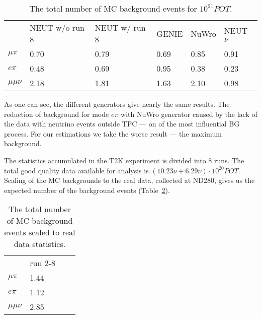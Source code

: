 \documentclass[../main.tex]{subfiles}
\begin{document}
\begin{table}[!ht]
\begin{center}
\begin{tabular}{llllll}
                            & NEUT w/o run 8      & NEUT w/ run 8         & GENIE                   & NuWro   & NEUT $\bar{\nu}$  \\
  $\mu\pi$ \hspace{0.5cm}   & 0.70  \hspace{2cm}  & 0.79                    & 0.69  \hspace{2cm}      & 0.85    & 0.91              \\
  $e\pi$                    & 0.48                & 0.69                    & 0.95                    & 0.38    & 0.23              \\
  $\mu\mu\nu$               & 2.18                & 1.81                    & 1.63                    & 2.10    & 0.98              \\
\end{tabular}
\caption{The total number of MC background events for $10^{21} POT$.}
\label{tbl:HNL:bg}
\end{center}
\end{table}

As one can see, the different generators give nearly the same results. The reduction of background for mode $e\pi$ with NuWro generator caused by the lack of the data with neutrino events outside TPC --- on of the most influential BG process. For our estimations we take the worse result --- the maximum background.

The statistics accumulated in the T2K experiment is divided into 8 runs. The total good quality data available for analysis is $\left(10.23\nu+6.29\bar{\nu}\right)\cdot 10^{20}POT$. Scaling of the MC backgrounds to the real data, collected at ND280, gives us the expected number of the background events (Table~\ref{tbl:HNL:bgScale}).

\begin{table}[!ht]
\begin{center}
\begin{tabular}{llll}
                            & run 2-8               \\
  $\mu\pi$ \hspace{0.5cm}   & 1.44  \hspace{2cm}    \\
  $e\pi$                    & 1.12                  \\
  $\mu\mu\nu$               & 2.85                  \\
\end{tabular}
\caption{The total number of MC background events scaled to real data statistics.}
\label{tbl:HNL:bgScale}
\end{center}
\end{table}
\end{document}
